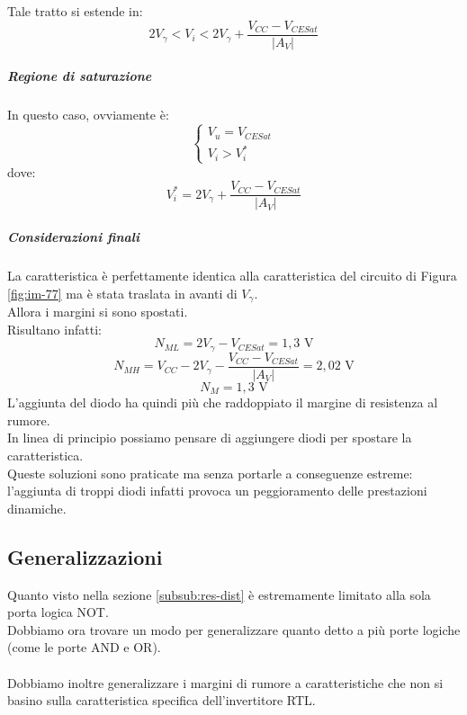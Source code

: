 \documentclass[../main.tex]{subfiles}
\begin{document}
	Tale tratto si estende in:
	$$2V_\gamma < V_i < 2V_\gamma + \frac{V_{CC} - V_{CESat}}{|A_V|}$$
	\subparagraph{Regione di saturazione} 
	In questo caso, ovviamente è:
	$$\begin{cases} V_u = V_{CESat} \\ V_i > V_i^* \end{cases}$$
	dove:
	$$V_i^* = 2V_\gamma + \frac{V_{CC} - V_{CESat}}{|A_V|}$$
	\subparagraph{Considerazioni finali} 
	La caratteristica è perfettamente identica alla caratteristica del circuito di Figura \ref{fig:im-77} ma è stata traslata in avanti di $V_\gamma$. \\
	Allora i margini si sono spostati. \\
	Risultano infatti:
	$$N_{ML} = 2V_\gamma - V_{CESat} = 1,3 \text{ V}$$
	$$N_{MH} = V_{CC} - 2V_\gamma - \frac{V_{CC} - V_{CESat}}{|A_V|} = 2,02 \text{ V}$$
	$$N_M = 1,3 \text{ V}$$
	L’aggiunta del diodo ha quindi più che raddoppiato il margine di resistenza al rumore. \\
	In linea di principio possiamo pensare di aggiungere diodi per spostare la caratteristica. \\
	Queste soluzioni sono praticate ma senza portarle a conseguenze estreme: l’aggiunta di troppi diodi infatti provoca un peggioramento delle prestazioni dinamiche.
	\subsection{Generalizzazioni}
	Quanto visto nella sezione \ref{subsub:res-dist} è estremamente limitato alla sola porta logica NOT. \\
	Dobbiamo ora trovare un modo per generalizzare quanto detto a più porte logiche (come le porte AND e OR).\\\\
	Dobbiamo inoltre generalizzare i margini di rumore a caratteristiche che non si basino sulla caratteristica specifica dell’invertitore RTL.
\end{document}
